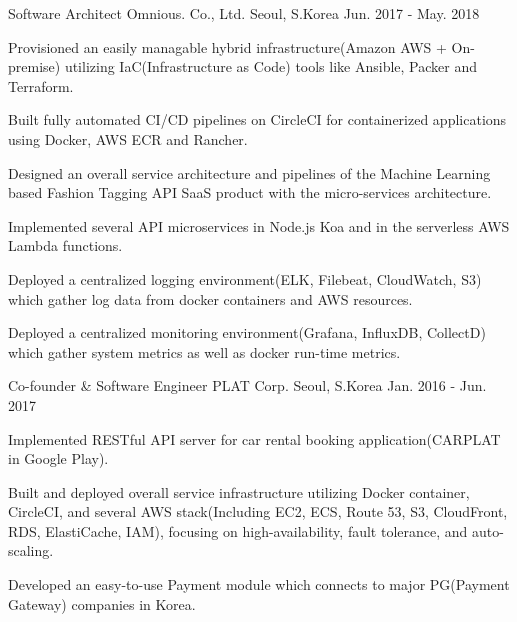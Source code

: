 \begin{cventries}
  \cventry
    {Software Architect} %
    {Omnious. Co., Ltd.} %
    {Seoul, S.Korea} %
    {Jun. 2017 - May. 2018} %
    {
      \begin{cvitems} %
        \item {Provisioned an easily managable hybrid infrastructure(Amazon AWS + On-premise) utilizing IaC(Infrastructure as Code) tools like Ansible, Packer and Terraform.}
        \item {Built fully automated CI/CD pipelines on CircleCI for containerized applications using Docker, AWS ECR and Rancher.}
        \item {Designed an overall service architecture and pipelines of the Machine Learning based Fashion Tagging API SaaS product with the micro-services architecture.}
        \item {Implemented several API microservices in Node.js Koa and in the serverless AWS Lambda functions.}
        \item {Deployed a centralized logging environment(ELK, Filebeat, CloudWatch, S3) which gather log data from docker containers and AWS resources.}
        \item {Deployed a centralized monitoring environment(Grafana, InfluxDB, CollectD) which gather system metrics as well as docker run-time metrics.}
      \end{cvitems}
    }

  \cventry
    {Co-founder \& Software Engineer} %
    {PLAT Corp.} %
    {Seoul, S.Korea} %
    {Jan. 2016 - Jun. 2017} %
    {
      \begin{cvitems} %
        \item {Implemented RESTful API server for car rental booking application(CARPLAT in Google Play).}
        \item {Built and deployed overall service infrastructure utilizing Docker container, CircleCI, and several AWS stack(Including EC2, ECS, Route 53, S3, CloudFront, RDS, ElastiCache, IAM), focusing on high-availability, fault tolerance, and auto-scaling.}
        \item {Developed an easy-to-use Payment module which connects to major PG(Payment Gateway) companies in Korea.}
      \end{cvitems}
    }


\end{cventries}
